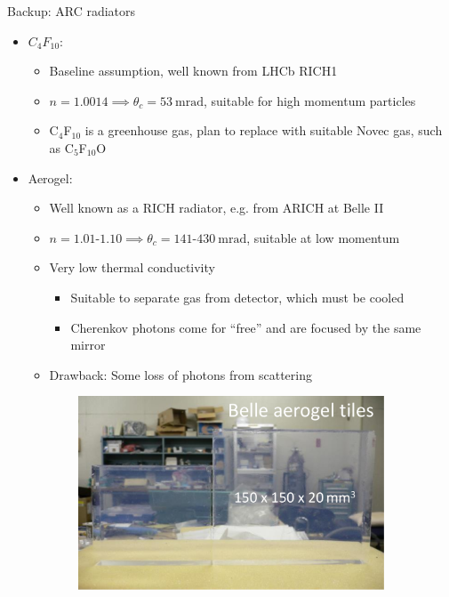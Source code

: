 \documentclass{beamer}
\begin{document}
\begin{frame}{Backup: ARC radiators}
  \begin{itemize}
    \setlength\itemsep{0.4em}
    \item{$C_4F_{10}$:}
    \begin{itemize}
      \setlength\itemsep{0.1em}
      \item{Baseline assumption, well known from LHCb RICH1}
      \item{$n = 1.0014\implies\theta_c = \SI{53}{\milli\radian}$, suitable for high momentum particles}
      \item{C$_4$F$_{10}$ is a greenhouse gas, plan to replace with suitable Novec gas, such as C$_5$F$_{10}$O}
    \end{itemize}
    \item{Aerogel:}
    \begin{itemize}
      \setlength\itemsep{0.1em}
      \item{Well known as a RICH radiator, e.g. from ARICH at Belle II}
      \item{$n = 1.01$-$1.10\implies\theta_c = 141$-$\SI{430}{\milli\radian}$, suitable at low momentum}
      \item{Very low thermal conductivity}
      \begin{itemize}
        \item{Suitable to separate gas from detector, which must be cooled}
        \item{Cherenkov photons come for ``free'' and are focused by the same mirror}
      \end{itemize}
      \item{Drawback: Some loss of photons from scattering}
    \end{itemize}
  \end{itemize}
  \begin{figure}
    \centering
    \begin{subfigure}{0.25\textwidth}
      \includegraphics[width = 1.0\textwidth]{Plots/BelleAerogelTiles.png}

\end{subfigure}
\end{figure}
\end{frame}
\end{document}
